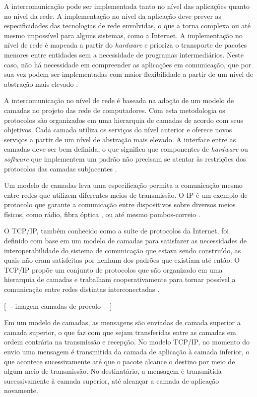 A intercomunicação pode ser implementada tanto no nível das aplicações quanto no
nível da rede. A implementação no nível da aplicação deve prever as especificidades
das tecnologias de rede envolvidas, o que a torna complexa ou até mesmo impossível
para alguns sistemas, como a Internet. A implementação no nível de rede é mapeada
a partir do \textit{hardware} e prioriza o transporte de pacotes menores entre
entidades sem a necessidade de programas intermediários. Neste caso, não há
necessidade em compreender as aplicações em comunicação, que por sua vez podem ser
implementadas com maior flexibilidade a partir de um nível de abstração mais elevado
\cite{comer 2000}.

A intercomunicação no nível de rede é baseada na adoção de um modelo de camadas no
projeto das rede de computadores. Com esta metodologia os protocolos são organizados
em uma hierarquia de camadas de acordo com seus objetivos. Cada camada utiliza os
serviços do nível anterior e oferece novos serviços a partir de um nível de
abstração mais elevado. A interface entre as camadas deve ser bem definida, o que
significa que componentes de \textit{hardware} ou \textit{software} que implementem
um padrão não precisam se atentar às restrições dos protocolos das camadas
subjacentes \cite{kurose2012}.

Um modelo de camadas leva uma especificação permita a comunicação mesmo entre redes
que utilizem diferentes meios de transmissão. O IP é um exemplo de protocolo que
garante a comunicação entre dispositivos sobre diversos meios físicos, como rádio,
fibra óptica \cite{tanenbaum2010}, ou até mesmo pombos-correio \cite{rfc1149}.

O TCP/IP, também conhecido como a suíte de protocolos da Internet, foi definido com
base em um modelo de camadas para satisfazer as necessidades de interoperabilidade
do sistema de comunicação que estava sendo construído, as quais não eram satisfeitas
por nenhum dos padrões que existiam até então. O TCP/IP propõe um conjunto de
protocolos  que são organizado em uma hierarquia de camadas e trabalham
cooperativamente para tornar possível a comunicação entre redes distintas
interconectadas \cite{comer2000}.

[--- imagem camadas de procolo ---]

Em um modelo de camadas, as mensagens são enviadas de camada superior a camada
superior, o que faz com que sejam transferidas entre as camadas em ordem contrária
na transmissão e recepção. No modelo TCP/IP, no momento do envio uma mensagem é
transmitida da camada de aplicação à camada inferior, o que acontece sucessivamente
até que o pacote alcance o destino por meio de algum meio de transmissão. No
destinatário, a mensagem é transmitida sucessivamente à camada superior, até
alcançar a camada de aplicação novamente.

